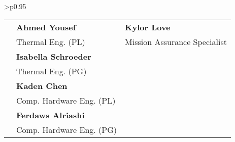 \begin{center}
\begin{minipage}{\textwidth}
\begin{tabular}{>{\centering\arraybackslash}p{}}
\begin{tabular}{>{\centering\arraybackslash}p{} >{\centering\arraybackslash}p{} >{\centering\arraybackslash}p{}}
& \textbf{Ahmed Yousef} & \textbf{Kylor Love}\\
& \small Thermal Eng. (PL) & \small Mission Assurance Specialist \\

& \textbf{Isabella Schroeder} & \\
& \small Thermal Eng. (PG) & \\

& \textbf{Kaden Chen} & \\
& \small Comp. Hardware Eng. (PL) & \\

& \textbf{Ferdaws Alriashi} & \\
& \small Comp. Hardware Eng. (PG) & \\

\end{tabular}
\end{tabular}
\end{minipage}
\end{center}
